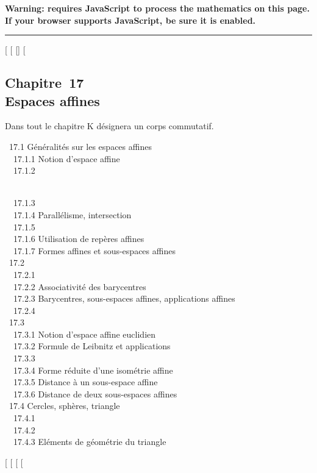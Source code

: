 \textbf{Warning: 
requires JavaScript to process the mathematics on this page.\\ If your
browser supports JavaScript, be sure it is enabled.}

\begin{center}\rule{3in}{0.4pt}\end{center}

{[}
{[}
{[}{]}
{[}

\subsection{Chapitre~17\\Espaces affines}

Dans tout le chapitre K désignera un corps commutatif.

~17.1 {Généralités sur les espaces
affines} \\ ~~17.1.1 {Notion
d'espace affine} \\ ~~17.1.2

\\ ~~17.1.3 
\\ ~~17.1.4 {Parallélisme,
intersection} \\ ~~17.1.5
 \\
~~17.1.6 {Utilisation de repères
affines} \\ ~~17.1.7 {Formes
affines et sous-espaces affines} \\ ~17.2
 \\ ~~17.2.1
 \\
~~17.2.2 {Associativité des
barycentres} \\ ~~17.2.3
{Barycentres, sous-espaces
affines, applications affines} \\ ~~17.2.4
 \\
~17.3 
\\ ~~17.3.1 {Notion d'espace
affine euclidien} \\ ~~17.3.2
{Formule de Leibnitz et
applications} \\ ~~17.3.3
 \\ ~~17.3.4
{Forme réduite d'une isométrie
affine} \\ ~~17.3.5 {Distance à
un sous-espace affine} \\ ~~17.3.6
{Distance de deux sous-espaces
affines} \\ ~17.4 {Cercles,
sphères, triangle} \\ ~~17.4.1
 \\
~~17.4.2  \\
~~17.4.3 {Eléments de géométrie
du triangle}

{[}
{[}
{[}
{[}

